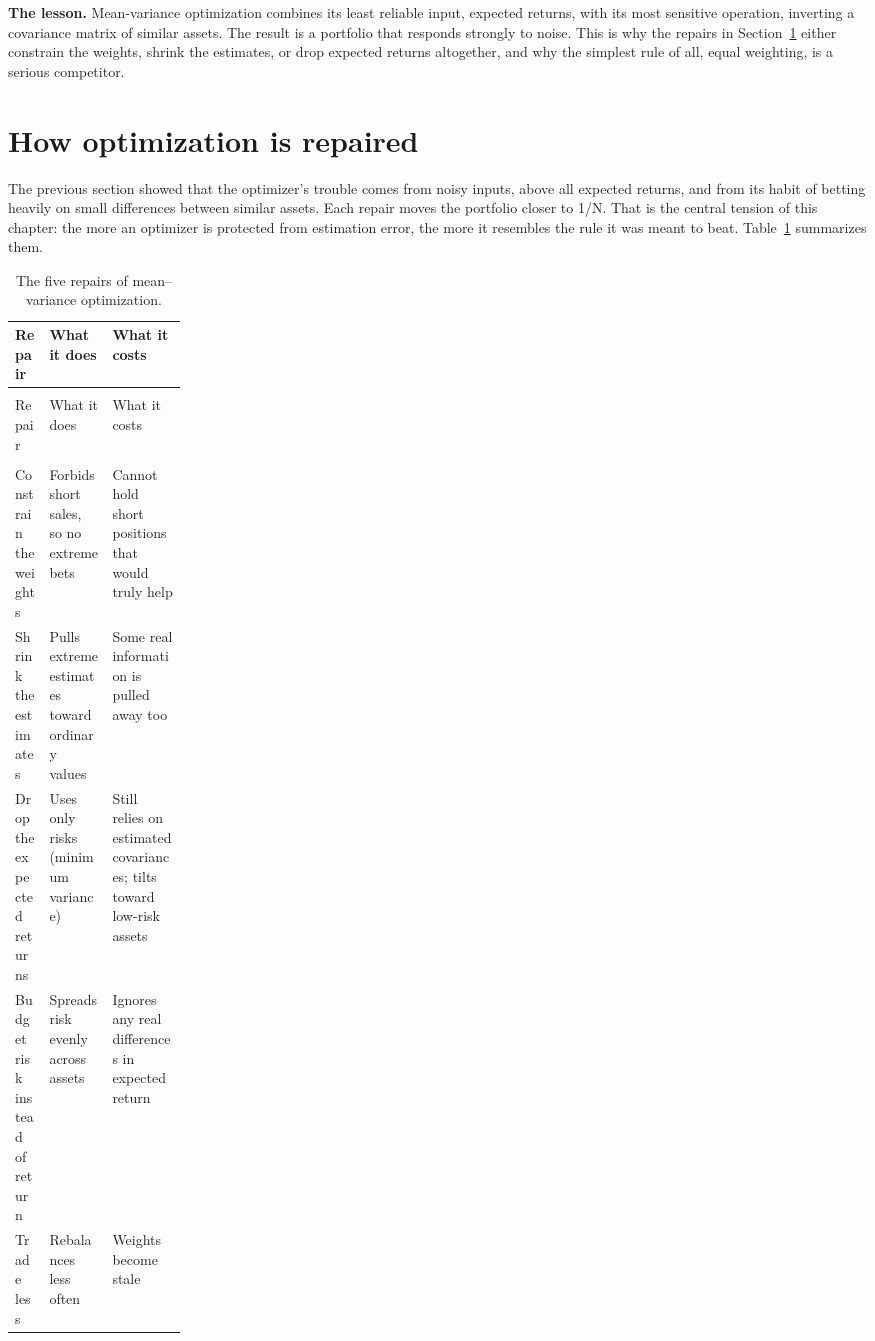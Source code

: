 \textbf{The lesson.} Mean-variance optimization combines its least reliable input, expected returns, with its most sensitive operation, inverting a covariance matrix of similar assets. The result is a portfolio that responds strongly to noise. This is why the repairs in Section~\ref{sec:12-repairs} either constrain the weights, shrink the estimates, or drop expected returns altogether, and why the simplest rule of all, equal weighting, is a serious competitor.


\section{How optimization is repaired}
\label{sec:12-repairs}

The previous section showed that the optimizer's trouble comes from noisy inputs, above all expected returns, and from its habit of betting heavily on small differences between similar assets.
Each repair moves the portfolio closer to 1/N. That is the central tension of this chapter: the more an optimizer is protected from estimation error, the more it resembles the rule it was meant to beat.
Table~\ref{tab:12-repairs} summarizes them.


{\small
\begin{longtable}{@{}>{\raggedright\arraybackslash}p{0.2\linewidth}>{\raggedright\arraybackslash}p{}>{\raggedright\arraybackslash}p{}@{}}
\caption{The five repairs of mean--variance optimization.}
\label{tab:12-repairs} \\
\toprule
Repair & What it does & What it costs \\
\midrule
\endfirsthead
\multicolumn{3}{@{}l}{\emph{Table~\thetable\ (continued)}} \\
\toprule
Repair & What it does & What it costs \\
\midrule
\endhead
\midrule
\multicolumn{3}{r@{}}{\emph{(continued on the next page)}} \\
\endfoot
\bottomrule
\endlastfoot
Constrain the weights & Forbids short sales, so no extreme bets & Cannot hold short positions that would truly help \\*
\addlinespace[3pt]
Shrink the estimates & Pulls extreme estimates toward ordinary values & Some real information is pulled away too \\
\addlinespace[3pt]
Drop the expected returns & Uses only risks (minimum variance) & Still relies on estimated covariances; tilts toward low-risk assets \\
\addlinespace[3pt]
Budget risk instead of return & Spreads risk evenly across assets & Ignores any real differences in expected return \\*
\addlinespace[3pt]
Trade less & Rebalances less often & Weights become stale \\
\end{longtable}
}


